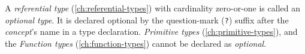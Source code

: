 A \emph{referential type} (\ref{ch:referential-types})
with cardinality zero-or-one is called an \emph{optional type}.
It is declared optional by the question-mark (\verb|?|) suffix
after the \emph{concept}'s name in a type declaration.
\emph{Primitive types} (\ref{ch:primitive-types}),
and the \emph{Function types} (\ref{ch:function-types})
cannot be declared as \emph{optional}.
